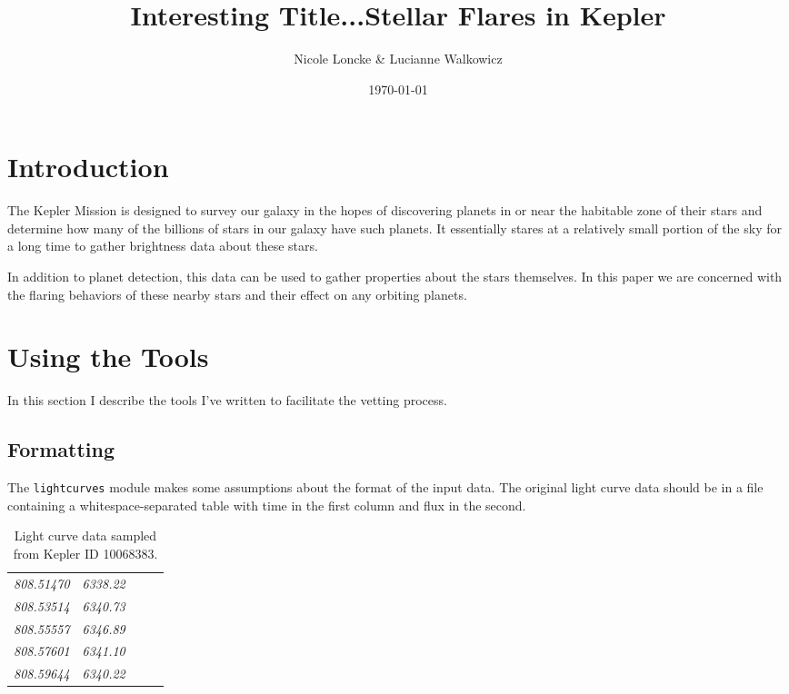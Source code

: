 \documentclass[11pt]{article}
\author{Nicole Loncke \& Lucianne Walkowicz}
\date{\today}
\title{Interesting Title...Stellar Flares in Kepler}
\begin{document}
\maketitle{}

\section{Introduction}
\label{sec:intro}

The Kepler Mission is designed to survey our galaxy in the hopes of
discovering planets in or near the habitable zone of their stars and
determine how many of the billions of stars in our galaxy have such
planets. It essentially stares at a relatively small portion of the
sky for a long time to gather brightness data about these stars.

In addition to planet detection, this data can be used to gather
properties about the stars themselves.  In this paper we are concerned
with the flaring behaviors of these nearby stars and their effect on
any orbiting planets.


\section{Using the Tools}
\label{sec:tools}

In this section I describe the tools I've written to facilitate the
vetting process.

\subsection{Formatting}
\label{sec:format}

The \verb|lightcurves| module makes some assumptions about the format
of the input data.  The original light curve data should be in a file
containing a whitespace-separated table with time in the first column
and flux in the second.
\begin{table}[h]
  \centering
  \begin{tabular}{>{\itshape}p{0.2\linewidth} >{\itshape}l}
       808.51470   &   6338.22 \\
       808.53514   &   6340.73 \\
       808.55557   &   6346.89 \\
       808.57601   &   6341.10 \\
       808.59644   &   6340.22 \\
  \end{tabular}
  \caption{Light curve data sampled from Kepler ID 10068383.}
\end{table}
\end{document}
